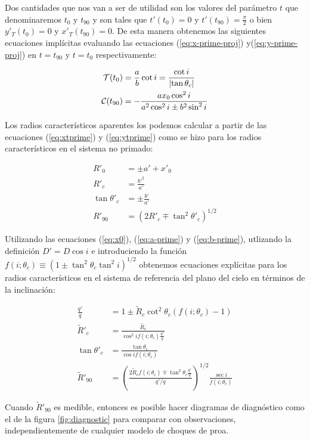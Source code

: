Dos cantidades que nos van a ser de utilidad son los valores del parámetro $t$
que denominaremos $t_0$ y $t_{90}$ y son tales que $t'(t_0) = 0$ y $t'(t_{90}) = \frac{\pi}{2}$
o bien $y'_T(t_0) = 0$ y $x'_T(t_{90}) = 0$. De esta manera obtenemos las siguientes ecuaciones
implícitas evaluando las ecuaciones (\ref{eq:x-prime-proj}) y(\ref{eq:y-prime-proj}) en $t=t_{90}$
y $t=t_0$ respectivamente:

\begin{align}
  \mathcal{T}(t_0) &= \frac{a}{b}\cot{i} = \frac{\cot{i}}{\left|\tan\theta_c\right|} \label{eq:t0}\\
  \mathcal{C}(t_{90}) &= -\frac{ax_0\cos^2{i}}{a^2\cos^2{i}\pm b^2\sin^2{i}} \label{eq:t90}
\end{align}

Los radios característicos aparentes los podemos calcular a partir de las ecuaciones (\ref{eq:xtprime}) y
(\ref{eq:ytprime}) como se hizo para los radios característicos en el sistema no primado:

\begin{align}
  R'_0 &= \pm a' + x'_0\\
  R'_c &= \frac{b'^2}{a'}\\
  \tan\theta'_c &= \pm\frac{b'}{a'} \\
  R'_{90} &= \left(2R'_c \mp \tan^2\theta'_c\right)^{1/2}
\end{align}

Utilizando las ecuaciones (\ref{eq:x0}), (\ref{eq:a-prime}) y (\ref{eq:b-prime}),
utlizando la definición $D' = D\cos i$ e introduciendo la función
$f(i;\theta_c)\equiv \left(1 \pm \tan^2\theta_c\tan^2i\right)^{1/2}$ obtenemos
ecuaciones explícitas para los radios característicos en el sistema de referencia
del plano del cielo en términos de la inclinación:

\begin{align}
  \frac{q'}{q} &= 1 \pm \tilde{R}_c\cot^2\theta_c\left(f(i;\theta_c) - 1\right) \\
  \tilde{R}'_c &= \frac{\tilde{R_c}}{\cos^2if(i;\theta_c)\frac{q'}{q}} \label{eq:Rpc-quad}\\
  \tan\theta'_c &= \frac{\tan\theta_c}{\cos if(i;\theta_c)} \label{eq:thcp-quad}\\
  \tilde{R}'_{90} &= \left(\frac{2\tilde{R}_cf(i;\theta_c) \mp
                    \tan^2\theta_c\frac{q'}{q}}{q'/q}\right)^{1/2}\frac{\sec i}{f(i;\theta_c)}
                    \label{eq:Rp90-quad}
\end{align}

Cuando $\tilde{R}'_{90}$ es medible, entonces es posible hacer diagramas de diagnóstico como
el de la figura \ref{fig:diagnostic} para comparar con observaciones, independientemente de cualquier modelo de choques de proa.

